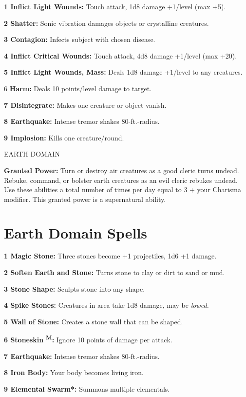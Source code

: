 \documentclass{article}
\begin{document}
\textbf{1 Inflict Light Wounds:} Touch attack, 1d8 damage +1/level (max +5).

\textbf{2 Shatter: }Sonic vibration damages objects or crystalline creatures.

\textbf{3 Contagion:} Infects subject with chosen disease.

\textbf{4 Inflict Critical Wounds:} Touch attack, 4d8 damage +1/level (max +20).

\textbf{5 Inflict Light Wounds, Mass:} Deals 1d8 damage +1/level to any creatures.

6\textbf{ Harm:} Deals 10 points/level damage to target.

\textbf{7 Disintegrate: }Makes one creature or object vanish.

\textbf{8 Earthquake:} Intense tremor shakes 80-ft.-radius.

\textbf{9 Implosion:} Kills one creature/round.

\vspace{12pt}
EARTH DOMAIN

\textbf{Granted Power:} Turn or destroy air creatures as a good cleric turns undead. 
Rebuke, command, or bolster earth creatures as an evil cleric rebukes undead. Use 
these abilities a total number of times per day equal to 3 + your Charisma modifier. 
This granted power is a supernatural ability.

\section*{\textbf{Earth Domain Spells}}

\textbf{1 Magic Stone:} Three stones become +1 projectiles, 1d6 +1 damage.

\textbf{2 Soften Earth and Stone: }Turns stone to clay or dirt to sand or mud.

\textbf{3 Stone Shape: }Sculpts stone into any shape.

\textbf{4 Spike Stones:} Creatures in area take 1d8 damage, may be \textit{lowed.}

\textbf{5 Wall of Stone: }Creates a stone wall that can be shaped.

\textbf{6 Stoneskin }\textsuperscript{\textbf{M}}\textbf{:} Ignore 10 points of 
damage per attack.

\textbf{7 Earthquake:} Intense tremor shakes 80-ft.-radius.

\textbf{8 Iron Body:} Your body becomes living iron.

\textbf{9 Elemental Swarm*: }Summons multiple elementals.
\end{document}
